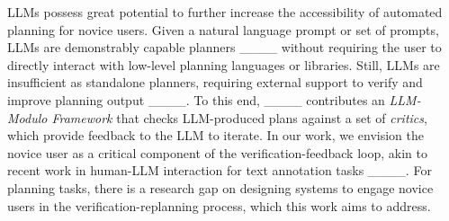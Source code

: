 LLMs possess great potential to further increase the accessibility of automated planning for novice users.
Given a natural language prompt or set of prompts, LLMs are demonstrably capable planners ____ without requiring the user to directly interact with low-level planning languages or libraries. Still, LLMs are insufficient as standalone planners, requiring external support to verify and improve planning output ____.
To this end, ____ contributes an \textit{LLM-Modulo Framework} that checks LLM-produced plans against a set of \textit{critics}, which provide feedback to the LLM to iterate. In our work, we envision the novice user as a critical component of the verification-feedback loop, akin to recent work in human-LLM interaction for text annotation tasks ____. For planning tasks, there is a research gap on designing systems to engage novice users in the verification-replanning process, which this work aims to address.

